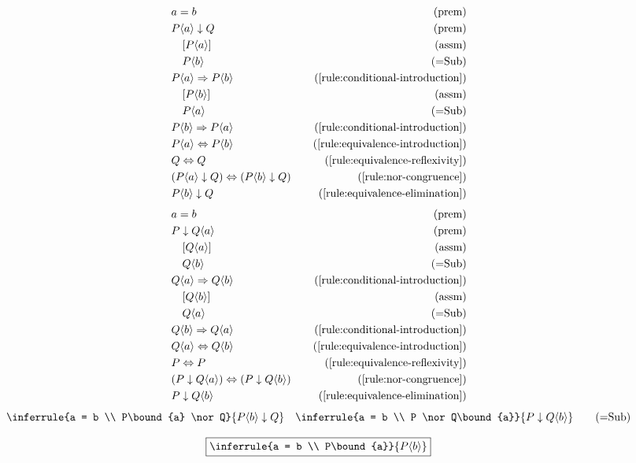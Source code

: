 \begin{align*}
    \premise{a = b}\\
    \premise{P\bound{a} \nor Q}\\
    \assumption[1]{P\bound{a}}\\
    \byrule[1]{P\bound{b}}{{=}Sub}\\
    \byrule{P\bound{a} \implies P\bound{b}}{\ref{rule:conditional-introduction}}\\
    \assumption[1]{P\bound{b}}\\
    \byrule[1]{P\bound{a}}{=Sub}\\
    \byrule{P\bound{b} \implies P\bound{a}}{\ref{rule:conditional-introduction}}\\
    \byrule{P\bound{a} \lequiv P\bound{b}}{\ref{rule:equivalence-introduction}}\\
    \byrule{Q \lequiv Q}{\ref{rule:equivalence-reflexivity}}\\
    \byrule{(P\bound{a} \nor Q) \lequiv (P\bound{b} \nor Q)}{\ref{rule:nor-congruence}}\\
    \byrule{P\bound{b} \nor Q}{\ref{rule:equivalence-elimination}}
\end{align*}
\begin{align*}
    \premise{a = b}\\
    \premise{P \nor Q\bound{a}}\\
    \assumption[1]{Q\bound{a}}\\
    \byrule[1]{Q\bound{b}}{{=}Sub}\\
    \byrule{Q\bound{a} \implies Q\bound{b}}{\ref{rule:conditional-introduction}}\\
    \assumption[1]{Q\bound{b}}\\
    \byrule[1]{Q\bound{a}}{=Sub}\\
    \byrule{Q\bound{b} \implies Q\bound{a}}{\ref{rule:conditional-introduction}}\\
    \byrule{Q\bound{a} \lequiv Q\bound{b}}{\ref{rule:equivalence-introduction}}\\
    \byrule{P \lequiv P}{\ref{rule:equivalence-reflexivity}}\\
    \byrule{(P \nor Q\bound{a}) \lequiv (P \nor Q\bound{b})}{\ref{rule:nor-congruence}}\\
    \byrule{P \nor Q\bound{b}}{\ref{rule:equivalence-elimination}}
\end{align*}
\begin{equation}
    \inferrule{a = b \\ P\bound{a} \nor Q}{P\bound{b} \nor Q} \quad \inferrule{a = b \\ P \nor Q\bound{a}}{P \nor Q\bound{b}}
    \tag{{$=$}Sub}
\end{equation}

\begin{equation}
    \boxed{\inferrule{a = b \\ P\bound{a}}{P\bound{b}}}
    \label{rule:equality-substitution}
\end{equation}
